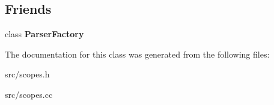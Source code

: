 \subsection*{Friends}
\begin{DoxyCompactItemize}
\item 
\hypertarget{classv8_1_1internal_1_1_scope_ac43d6a50f1f6ed99577048bea49180fb}{}class {\bfseries Parser\+Factory}\label{classv8_1_1internal_1_1_scope_ac43d6a50f1f6ed99577048bea49180fb}

\end{DoxyCompactItemize}


The documentation for this class was generated from the following files\+:\begin{DoxyCompactItemize}
\item 
src/scopes.\+h\item 
src/scopes.\+cc\end{DoxyCompactItemize}
